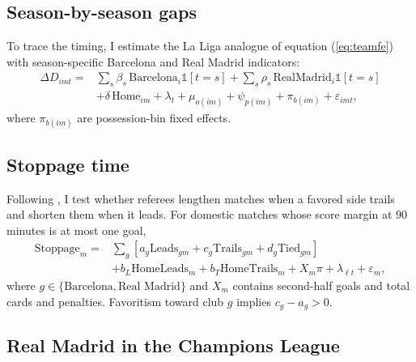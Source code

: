 \subsection{Season-by-season gaps}

To trace the timing, I estimate the La Liga analogue of equation (\ref{eq:teamfe}) with season-specific Barcelona and Real Madrid indicators:
\begin{equation}\label{eq:eventstudy}
\begin{split}
\Delta D_{imt} = {} & \sum_{s} \beta_s\, \text{Barcelona}_i \mathbb{1}[t=s] + \sum_{s} \rho_s\, \text{RealMadrid}_i \mathbb{1}[t=s] \\
& + \delta\, \text{Home}_{im} + \lambda_t + \mu_{o(im)} + \psi_{p(im)} + \pi_{b(im)} + \varepsilon_{imt},
\end{split}
\end{equation}
where $\pi_{b(im)}$ are possession-bin fixed effects.

\subsection{Stoppage time}

Following \citet{garicano2005favoritism}, I test whether referees lengthen matches when a favored side trails and shorten them when it leads. For domestic matches whose score margin at 90 minutes is at most one goal,
\begin{equation}\label{eq:stoppage}
\begin{split}
\text{Stoppage}_m = {} & \sum_{g} \left[a_g \text{Leads}_{gm} + c_g \text{Trails}_{gm} + d_g \text{Tied}_{gm}\right] \\
& + b_L \text{HomeLeads}_m + b_T \text{HomeTrails}_m + X_m \pi + \lambda_{\ell t} + \varepsilon_m,
\end{split}
\end{equation}
where $g \in \{\text{Barcelona}, \text{Real Madrid}\}$ and $X_m$ contains second-half goals and total cards and penalties. Favoritism toward club $g$ implies $c_g - a_g > 0$.

\subsection{Real Madrid in the Champions League}

